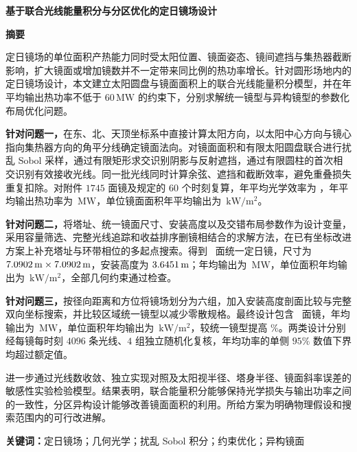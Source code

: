 \documentclass[UTF8,a4paper,zihao=-4,fontset=mac]{ctexart}
\newcommand{\unitp}{\mathrm{kW}/\mathrm{m}^{2}}
\begin{document}
\hypersetup{pageanchor=false}
\thispagestyle{empty}
\begin{center}
{\bfseries 基于联合光线能量积分与分区优化的定日镜场设计}\par
\vspace{5mm}
{\large\bfseries 摘\quad 要}
\end{center}

定日镜场的单位面积产热能力同时受太阳位置、镜面姿态、镜间遮挡与集热器截断影响，扩大镜面或增加镜数并不一定带来同比例的热功率增长。针对圆形场地内的定日镜场设计，本文建立太阳圆盘与镜面面积上的联合光线能量积分模型，并在年平均输出热功率不低于 $60\,\mathrm{MW}$ 的约束下，分别求解统一镜型与异构镜型的参数化布局优化问题。

\textbf{针对问题一，}在东、北、天顶坐标系中直接计算太阳方向，以太阳中心方向与镜心指向集热器方向的角平分线确定镜面法向。对镜面面积和有限太阳圆盘联合进行扰乱 Sobol 采样，通过有限矩形求交识别阴影与反射遮挡，通过有限圆柱的首次相交识别有效接收光线。同一批光线同时计算余弦、遮挡和截断效率，避免重叠损失重复扣除。对附件 $1745$ 面镜及规定的 $60$ 个时刻复算，年平均光学效率为 \QoneOpt，年平均输出热功率为 \QoneP\,$\mathrm{MW}$，单位镜面面积年平均输出为 \QoneJ\,$\unitp$。

\textbf{针对问题二，}将塔址、统一镜面尺寸、安装高度以及交错布局参数作为设计变量，采用容量筛选、完整光线追踪和收益排序删镜相结合的求解方法，在已有坐标改进方案上补充塔址与环带相位的多起点搜索。得到 \QtwoCount\ 面统一定日镜，尺寸为 $7.0902\,\mathrm m\times7.0902\,\mathrm m$，安装高度为 $3.6451\,\mathrm m$；年均输出为 \QtwoP\,$\mathrm{MW}$，单位面积年均输出为 \QtwoJ\,$\unitp$，全部几何约束通过检查。

\textbf{针对问题三，}按径向距离和方位将镜场划分为六组，加入安装高度剖面比较与完整双向坐标搜索，并比较区域统一镜型以减少零散规格。最终设计包含 \QthreeCount\ 面镜，年均输出为 \QthreeP\,$\mathrm{MW}$，单位面积年均输出为 \QthreeJ\,$\unitp$，较统一镜型提高 \GainJ\%。两类设计分别经每镜每时刻 $4096$ 条光线、$4$ 组独立随机化复核，年均功率的单侧 $95\%$ 数值下界均超过额定值。

进一步通过光线数收敛、独立实现对照及太阳视半径、塔身半径、镜面斜率误差的敏感性实验检验模型。结果表明，联合能量积分能够保持光学损失与输出功率之间的一致性，分区异构设计能够改善镜面面积的利用。所给方案为明确物理假设和搜索范围内的可行改进解。

\vspace{3mm}
\noindent\textbf{关键词：}定日镜场；几何光学；扰乱 Sobol 积分；约束优化；异构镜面

\clearpage
\setcounter{page}{1}
\hypersetup{pageanchor=true}
\end{document}
